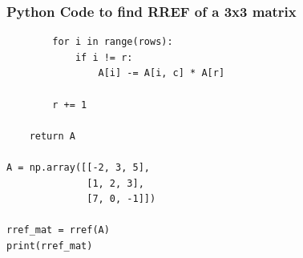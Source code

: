 \documentclass{beamer}
\begin{document}
\begin{frame}[fragile]
\frametitle{Python Code to find RREF of a 3x3 matrix}
\begin{verbatim}
        for i in range(rows):
            if i != r:
                A[i] -= A[i, c] * A[r]
        
        r += 1
    
    return A

A = np.array([[-2, 3, 5],
              [1, 2, 3],
              [7, 0, -1]])

rref_mat = rref(A)
print(rref_mat)
\end{verbatim}
\end{frame}
\end{document}
